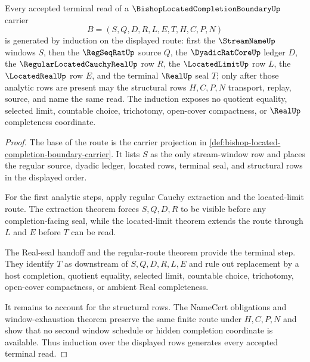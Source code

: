 \begin{theorem}
\label{thm:bishop-located-completion-boundary-inductive-route}
Every accepted terminal read of a $\BishopLocatedCompletionBoundaryUp$ carrier
$$
B=(S,Q,D,R,L,E,T,H,C,P,N)
$$
is generated by induction on the displayed route: first the $\StreamNameUp$ windows $S$, then the $\RegSeqRatUp$ source $Q$, the $\DyadicRatCoreUp$ ledger $D$, the $\RegularLocatedCauchyRealUp$ row $R$, the $\LocatedLimitUp$ row $L$, the $\LocatedRealUp$ row $E$, and the terminal $\RealUp$ seal $T$; only after those analytic rows are present may the structural rows $H,C,P,N$ transport, replay, source, and name the same read. The induction exposes no quotient equality, selected limit, countable choice, trichotomy, open-cover compactness, or $\RealUp$ completeness coordinate.
\end{theorem}
\begin{proof}
The base of the route is the carrier projection in \autoref{def:bishop-located-completion-boundary-carrier}. It lists $S$ as the only stream-window row and places the regular source, dyadic ledger, located rows, terminal seal, and structural rows in the displayed order.

For the first analytic steps, apply regular Cauchy extraction and the located-limit route. The extraction theorem forces $S,Q,D,R$ to be visible before any completion-facing seal, while the located-limit theorem extends the route through $L$ and $E$ before $T$ can be read.

The Real-seal handoff and the regular-route theorem provide the terminal step. They identify $T$ as downstream of $S,Q,D,R,L,E$ and rule out replacement by a host completion, quotient equality, selected limit, countable choice, trichotomy, open-cover compactness, or ambient Real completeness.

It remains to account for the structural rows. The NameCert obligations and window-exhaustion theorem preserve the same finite route under $H,C,P,N$ and show that no second window schedule or hidden completion coordinate is available. Thus induction over the displayed rows generates every accepted terminal read.
\end{proof}

